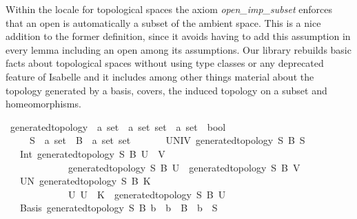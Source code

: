 \documentclass[12pt]{scrartcl}
\begin{document}
Within the locale for topological spaces the axiom \textit{open\_imp\_subset} enforces that an open is automatically a subset of the ambient space. This is a nice addition to the former definition, since it avoids having to add this assumption in every lemma including an open among its assumptions. Our library rebuilds basic facts about topological spaces without using type classes or any deprecated feature of Isabelle and it includes among other things material about the topology generated by a basis, covers, the induced topology on a subset and homeomorphisms. 
\begin{isabelle}
\isamarkupfalse%
\ generated{\isacharunderscore}{\kern0pt}topology\ {\isacharcolon}{\kern0pt}{\isacharcolon}{\kern0pt}\ {\isachardoublequoteopen}{\isacharprime}{\kern0pt}a\ set\ {\isasymRightarrow}\ {\isacharprime}{\kern0pt}a\ set\ set\ {\isasymRightarrow}\ {\isacharprime}{\kern0pt}a\ set\ {\isasymRightarrow}\ bool{\isachardoublequoteclose}\ \isanewline
\ \ \ \ \ S\ {\isacharcolon}{\kern0pt}{\isacharcolon}{\kern0pt}\ {\isachardoublequoteopen}{\isacharprime}{\kern0pt}a\ set{\isachardoublequoteclose}\ \ B\ {\isacharcolon}{\kern0pt}{\isacharcolon}{\kern0pt}\ {\isachardoublequoteopen}{\isacharprime}{\kern0pt}a\ set\ set{\isachardoublequoteclose}\isanewline
\ \ \isanewline
\ \ \ \ UNIV{\isacharcolon}{\kern0pt}\ {\isachardoublequoteopen}generated{\isacharunderscore}{\kern0pt}topology\ S\ B\ S{\isachardoublequoteclose}\isanewline
\ \ {\isacharbar}{\kern0pt}\ Int{\isacharcolon}{\kern0pt}\ {\isachardoublequoteopen}generated{\isacharunderscore}{\kern0pt}topology\ S\ B\ {\isacharparenleft}{\kern0pt}U\ {\isasyminter}\ V{\isacharparenright}{\kern0pt}{\isachardoublequoteclose}\ \isanewline
\ \ \ \ \ \ \ \ \ \ \ \ \ {\isachardoublequoteopen}generated{\isacharunderscore}{\kern0pt}topology\ S\ B\ U{\isachardoublequoteclose}\ \ {\isachardoublequoteopen}generated{\isacharunderscore}{\kern0pt}topology\ S\ B\ V{\isachardoublequoteclose}\isanewline
\ \ {\isacharbar}{\kern0pt}\ UN{\isacharcolon}{\kern0pt}\ {\isachardoublequoteopen}generated{\isacharunderscore}{\kern0pt}topology\ S\ B\ {\isacharparenleft}{\kern0pt}{\isasymUnion}K{\isacharparenright}{\kern0pt}{\isachardoublequoteclose}\ \isanewline
\ \ \ \ \ \ \ \ \ \ \ \ \ {\isachardoublequoteopen}{\isacharparenleft}{\kern0pt}{\isasymAnd}U{\isachardot}{\kern0pt}\ U\ {\isasymin}\ K\ {\isasymLongrightarrow}\ generated{\isacharunderscore}{\kern0pt}topology\ S\ B\ U{\isacharparenright}{\kern0pt}{\isachardoublequoteclose}\isanewline
\ \ {\isacharbar}{\kern0pt}\ Basis{\isacharcolon}{\kern0pt}\ {\isachardoublequoteopen}generated{\isacharunderscore}{\kern0pt}topology\ S\ B\ b{\isachardoublequoteclose}\ \ {\isachardoublequoteopen}b\ {\isasymin}\ B\ {\isasymand}\ b\ {\isasymsubseteq}\ S{\isachardoublequoteclose}
\end{isabelle}
\end{document}
